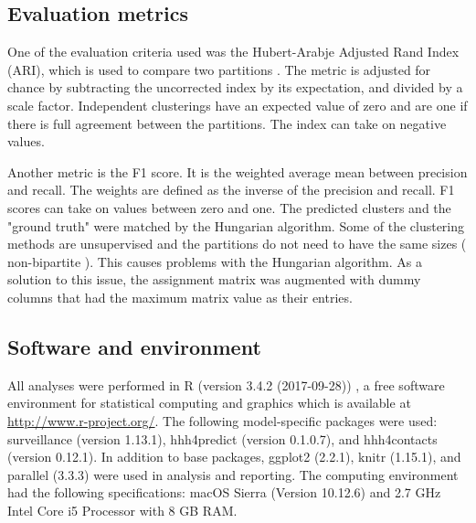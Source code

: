 \documentclass[11pt, a4paper]{article}\usepackage[]{graphicx}\usepackage[]{color}
\begin{document}
\subsection{Evaluation metrics}
One of the evaluation criteria used was the Hubert-Arabje Adjusted Rand Index (ARI), which is used to compare two partitions \citep{hubert1985comparing}. The metric is adjusted for chance by subtracting the uncorrected index by its expectation, and divided by a scale factor. Independent clusterings have an expected value of zero and are one if there is full agreement between the partitions. The index can take on negative values.

Another metric is the F1 score. It is the weighted average mean between precision and recall. The weights are defined as the inverse of the precision and recall. F1 scores can take on values between zero and  one. The predicted clusters and the "ground truth" were matched by the Hungarian algorithm. Some of the clustering methods are unsupervised and the partitions do not need to have the same sizes ( non-bipartite ). This causes problems with the Hungarian algorithm. As a solution to this issue, the assignment matrix was augmented with dummy columns that had the maximum matrix value as their entries.
\subsection{Software and environment}
All analyses were performed in R (version 3.4.2 (2017-09-28)) \citep{R}, a free software environment for statistical computing and graphics which is available at \url{http://www.r-project.org/}. The following model-specific packages were used: surveillance (version 1.13.1), hhh4predict (version 0.1.0.7), and hhh4contacts (version 0.12.1). In addition to base packages, ggplot2 (2.2.1), knitr (1.15.1), and parallel (3.3.3) were used in analysis and reporting. The computing environment had the following specifications: macOS Sierra (Version 10.12.6) and 2.7 GHz Intel Core i5 Processor with 8 GB RAM.
\end{document}
